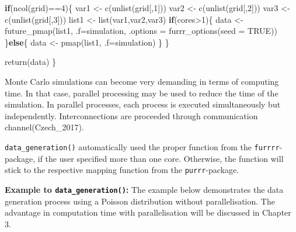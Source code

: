 \documentclass[11pt,a4paper]{article}
\newenvironment{Shaded}{\begin{snugshade}}{\end{snugshade}}
\newcommand{\AttributeTok}[1]{\textcolor[rgb]{0.77,0.63,0.00}{#1}}
\newcommand{\ConstantTok}[1]{\textcolor[rgb]{0.00,0.00,0.00}{#1}}
\newcommand{\ControlFlowTok}[1]{\textcolor[rgb]{0.13,0.29,0.53}{\textbf{#1}}}
\newcommand{\DecValTok}[1]{\textcolor[rgb]{0.00,0.00,0.81}{#1}}
\newcommand{\FunctionTok}[1]{\textcolor[rgb]{0.00,0.00,0.00}{#1}}
\newcommand{\NormalTok}[1]{#1}
\newcommand{\OtherTok}[1]{\textcolor[rgb]{0.56,0.35,0.01}{#1}}
\newcommand{\SpecialCharTok}[1]{\textcolor[rgb]{0.00,0.00,0.00}{#1}}
\begin{document}
\begin{Shaded}
\begin{Highlighting}[]
  \ControlFlowTok{if}\NormalTok{(}\FunctionTok{ncol}\NormalTok{(grid)}\SpecialCharTok{==}\DecValTok{4}\NormalTok{)\{}
\NormalTok{    var1 }\OtherTok{\textless{}{-}} \FunctionTok{c}\NormalTok{(}\FunctionTok{unlist}\NormalTok{(grid[,}\DecValTok{1}\NormalTok{]))}
\NormalTok{    var2 }\OtherTok{\textless{}{-}} \FunctionTok{c}\NormalTok{(}\FunctionTok{unlist}\NormalTok{(grid[,}\DecValTok{2}\NormalTok{]))}
\NormalTok{    var3 }\OtherTok{\textless{}{-}} \FunctionTok{c}\NormalTok{(}\FunctionTok{unlist}\NormalTok{(grid[,}\DecValTok{3}\NormalTok{]))}
\NormalTok{    list1 }\OtherTok{\textless{}{-}} \FunctionTok{list}\NormalTok{(var1,var2,var3)}
    \ControlFlowTok{if}\NormalTok{(cores}\SpecialCharTok{\textgreater{}}\DecValTok{1}\NormalTok{)\{}
\NormalTok{      data }\OtherTok{\textless{}{-}} \FunctionTok{future\_pmap}\NormalTok{(list1, }\AttributeTok{.f=}\NormalTok{simulation,}
                          \AttributeTok{.options =} \FunctionTok{furrr\_options}\NormalTok{(}\AttributeTok{seed =} \ConstantTok{TRUE}\NormalTok{))}
\NormalTok{    \}}\ControlFlowTok{else}\NormalTok{\{}
\NormalTok{      data }\OtherTok{\textless{}{-}} \FunctionTok{pmap}\NormalTok{(list1, }\AttributeTok{.f=}\NormalTok{simulation)}
\NormalTok{    \}}
\NormalTok{  \}}
  
  \FunctionTok{return}\NormalTok{(data)}
\NormalTok{\}}
\end{Highlighting}
\end{Shaded}

Monte Carlo simulations can become very demanding in terms of computing
time. In that case, parallel processing may be used to reduce the time
of the simulation. In parallel processes, each process is executed
simultaneously but independently. Interconnections are proceeded through
communication channel(Czech\_2017).

\texttt{data\_generation()} automatically used the proper function from
the \texttt{furrrr}-package, if the user specified more than one core.
Otherwise, the function will stick to the respective mapping function
from the \texttt{purrr}-package.

\textbf{Example to \texttt{data\_generation()}:} The example below
demonstrates the data generation process using a Poisson distribution
without parallelisation. The advantage in computation time with
parallelisation will be discussed in Chapter 3.
\end{document}
